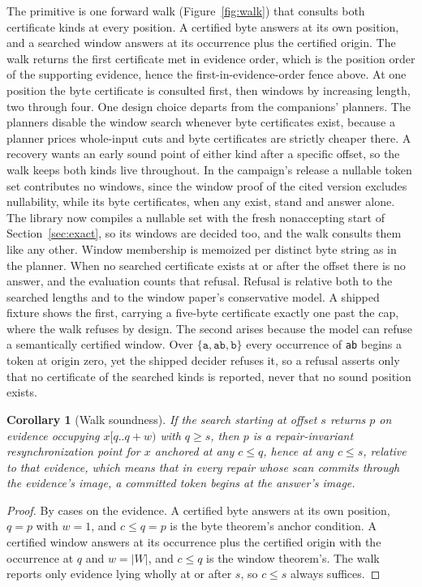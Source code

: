 \documentclass[11pt,a4paper]{article}
\theoremstyle{definition}
\theoremstyle{plain}
\newtheorem{corollary}{Corollary}
\theoremstyle{remark}
\newcommand{\code}[1]{\texttt{#1}}
\newcommand{\window}[3]{#1[#2..#3)}
\begin{document}
The primitive is one forward walk (Figure~\ref{fig:walk}) that consults both certificate kinds at every position. A
certified byte answers at its own position, and a searched window answers at its occurrence plus the certified origin.
The walk returns the first certificate met in evidence order, which is the position order of the supporting evidence,
hence the first-in-evidence-order fence above. At one position the byte certificate is consulted first, then windows by
increasing length, two through four. One design choice departs from the companions' planners. The planners disable the
window search whenever byte certificates exist, because a planner prices whole-input cuts and byte certificates are
strictly cheaper there. A recovery wants an early sound point of either kind after a specific offset, so the walk keeps
both kinds live throughout. In the campaign's release a nullable token set contributes no windows, since the window
proof of the cited version excludes nullability, while its byte certificates, when any exist, stand and answer alone.
The library now compiles a nullable set with the fresh nonaccepting start of Section~\ref{sec:exact}, so its windows are
decided too, and the walk consults them like any other. Window membership is memoized per distinct byte string as in the
planner. When no searched certificate exists at or after the offset there is no answer, and the evaluation counts that
refusal. Refusal is relative both to the searched lengths and to the window paper's conservative model. A shipped
fixture shows the first, carrying a five-byte certificate exactly one past the cap, where the walk refuses by design.
The second arises because the model can refuse a semantically certified window. Over $\{\code{a}, \code{ab}, \code{b}\}$
every occurrence of \code{ab} begins a token at origin zero, yet the shipped decider refuses it, so a refusal asserts
only that no certificate of the searched kinds is reported, never that no sound position exists.

\begin{corollary}[Walk soundness]
If the search starting at offset $s$ returns $p$ on evidence occupying $\window{x}{q}{q+w}$ with $q \ge s$, then $p$ is
a repair-invariant resynchronization point for $x$ anchored at any $c \le q$, hence at any $c \le s$, relative to that
evidence, which means that in every repair whose scan commits through the evidence's image, a committed token begins at
the answer's image.
\end{corollary}

\begin{proof}
By cases on the evidence. A certified byte answers at its own position, $q = p$ with $w = 1$, and $c \le q = p$ is the
byte theorem's anchor condition. A certified window answers at its occurrence plus the certified origin with the
occurrence at $q$ and $w = |W|$, and $c \le q$ is the window theorem's. The walk reports only evidence lying wholly at
or after $s$, so $c \le s$ always suffices.
\end{proof}
\end{document}
